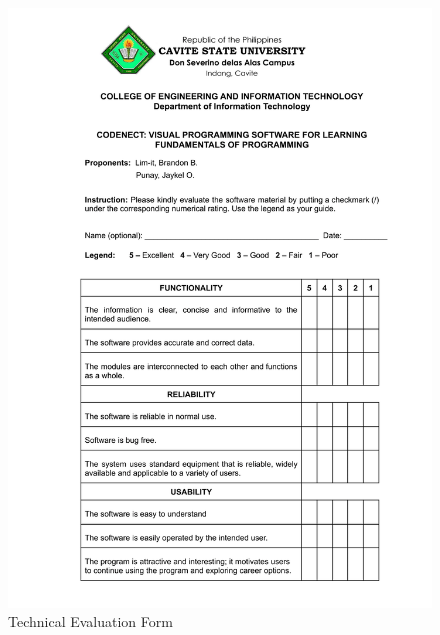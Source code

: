 \clearpage
\null\vfill
\begin{figure}[H]
	 \centering
	 \includegraphics[width=\textwidth]{figures/tech_eval_form.png}
	 \caption[]{Technical Evaluation Form}
	 \label{fig:tech_eval_form}
\end{figure}

